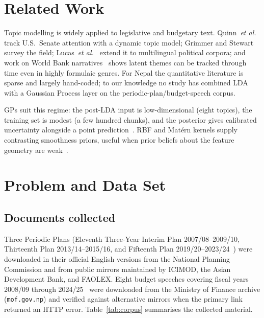 \documentclass[conference]{IEEEtran}
\begin{document}
\section{Related Work}\label{sec:related}
Topic modelling is widely applied to legislative and budgetary text.
Quinn~\textit{et al.}~\cite{quinn2010} track U.S.\ Senate attention
with a dynamic topic model; Grimmer and Stewart~\cite{grimmer2013text}
survey the field; Lucas~\textit{et al.}~\cite{lucas2015computer}
extend it to multilingual political corpora; and work on World Bank
narratives~\cite{moretti2015} shows latent themes can be tracked
through time even in highly formulaic genres.  For Nepal the
quantitative literature is sparse and largely hand-coded; to our
knowledge no study has combined LDA with a Gaussian Process layer on
the periodic-plan/budget-speech corpus.

GPs suit this regime: the post-LDA input is low-dimensional (eight
topics), the training set is modest (a few hundred chunks), and the
posterior gives calibrated uncertainty alongside a point
prediction~\cite{rasmussen2006gaussian,williams1998bayesian}.  RBF and
Mat\'ern kernels supply contrasting smoothness priors, useful when
prior beliefs about the feature geometry are
weak~\cite{stein1999interpolation}.

\section{Problem and Data Set}\label{sec:data}

\subsection{Documents collected}
Three Periodic Plans (Eleventh Three-Year Interim Plan 2007/08--2009/10,
Thirteenth Plan 2013/14--2015/16, and Fifteenth Plan
2019/20--2023/24~\cite{npc15}) were downloaded in their official English versions
from the National Planning Commission and from public mirrors
maintained by ICIMOD, the Asian Development Bank, and FAOLEX.  Eight
budget speeches covering fiscal years 2008/09 through
2024/25~\cite{mof2024} were
downloaded from the Ministry of Finance archive
(\texttt{mof.gov.np}) and verified against alternative mirrors when
the primary link returned an HTTP error.  Table~\ref{tab:corpus}
summarises the collected material.
\end{document}
